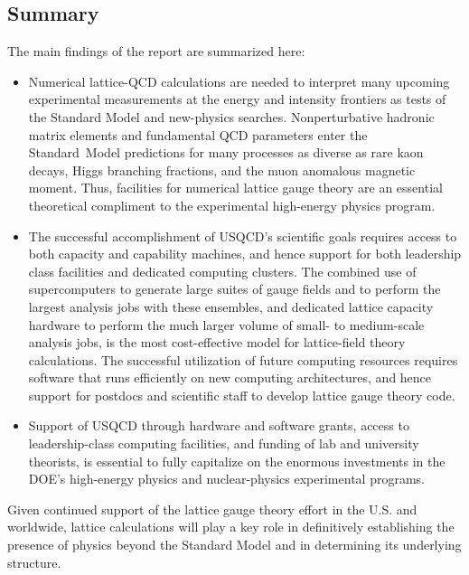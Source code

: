 \subsection{Summary}

The main findings of the report are summarized here:

\begin{itemize}

\item Numerical lattice-QCD calculations are needed to interpret many upcoming
experimental measurements at the energy and intensity frontiers as tests of
the Standard Model and new-physics searches.  Nonperturbative hadronic matrix
elements and fundamental QCD parameters enter the Standard~Model predictions
for many processes as diverse as rare kaon decays, Higgs branching fractions,
and the muon anomalous magnetic moment.  Thus, facilities for numerical
lattice gauge theory are an essential theoretical compliment to the
experimental high-energy physics program.

\item The successful accomplishment of USQCD's scientific goals requires
access to both capacity and capability machines, and hence support for both
leadership class facilities and dedicated computing clusters.  The combined
use of supercomputers to generate large suites of gauge fields and to perform
the largest analysis jobs with these ensembles, and dedicated lattice capacity
hardware to perform the much larger volume of small- to medium-scale analysis
jobs, is the most cost-effective model for lattice-field theory calculations.
The successful utilization of future computing resources requires software
that runs efficiently on new computing architectures, and hence support for
postdocs and scientific staff to develop lattice gauge theory code.

\item Support of USQCD through hardware and software grants, access to
leadership-class computing facilities, and funding of lab and university
theorists, is essential to fully capitalize on the enormous investments in the
DOE's high-energy physics and nuclear-physics experimental programs.

\end{itemize}

Given continued support of the lattice gauge theory effort in the U.S. and
worldwide, lattice calculations will play a key role in definitively
establishing the presence of physics beyond the Standard Model and in
determining its underlying structure.

